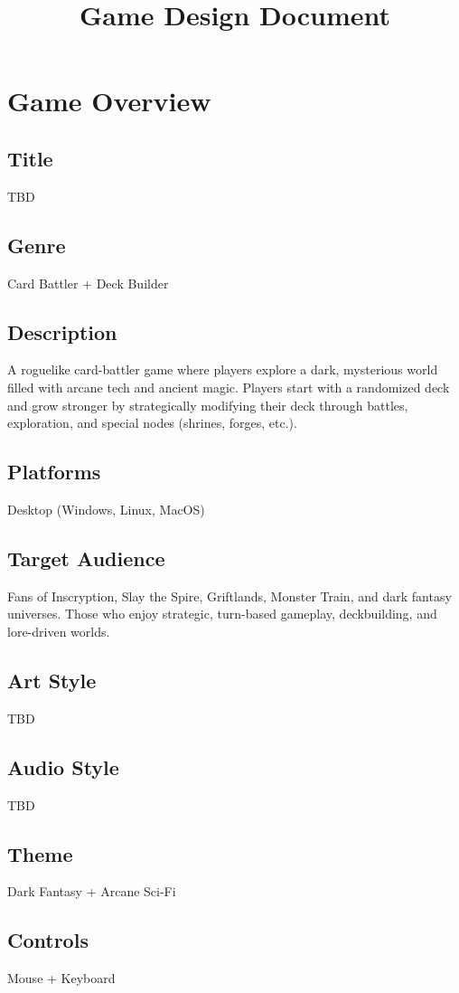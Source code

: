 \documentclass[10pt, a4paper]{article}
\title{Game Design Document}
\author{}
\date{}
\begin{document}
	\maketitle
	\tableofcontents
	\pagebreak
	
	\section{Game Overview}
	\subsection{Title} TBD
	\subsection{Genre} Card Battler + Deck Builder
	\subsection{Description} 
	A roguelike card-battler game where players explore a dark, mysterious world filled with arcane tech and ancient magic. Players start with a randomized deck and grow stronger by strategically modifying their deck through battles, exploration, and special nodes (shrines, forges, etc.).
	\subsection{Platforms} Desktop (Windows, Linux, MacOS)
	\subsection{Target Audience}  Fans of Inscryption, Slay the Spire, Griftlands, Monster Train, and dark fantasy universes. Those who enjoy strategic, turn-based gameplay, deckbuilding, and lore-driven worlds.
	\subsection{Art Style} TBD
	\subsection{Audio Style} TBD
	\subsection{Theme} Dark Fantasy + Arcane Sci-Fi
	\subsection{Controls} Mouse + Keyboard
	\pagebreak
\end{document}
